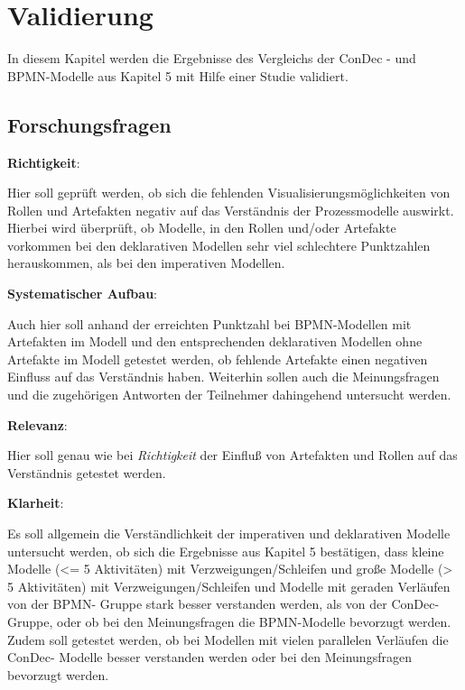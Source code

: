 \chapter{Validierung}\label{sec:chapter7}

In diesem Kapitel werden die Ergebnisse des Vergleichs der ConDec - und BPMN-Modelle aus Kapitel 5 mit Hilfe einer Studie validiert. 


\section{Forschungsfragen}

\textbf{Richtigkeit}: 


Hier soll geprüft werden, ob sich die fehlenden Visualisierungsmöglichkeiten von Rollen und Artefakten negativ auf das Verständnis der Prozessmodelle auswirkt. Hierbei wird überprüft, ob Modelle, in den Rollen und/oder Artefakte vorkommen bei den deklarativen Modellen sehr viel schlechtere Punktzahlen herauskommen, als bei den imperativen Modellen.\newline


\textbf{Systematischer Aufbau}: 


Auch hier soll anhand der erreichten Punktzahl bei BPMN-Modellen mit Artefakten im Modell und den entsprechenden deklarativen Modellen ohne Artefakte im Modell getestet werden, ob fehlende Artefakte einen negativen Einfluss auf das Verständnis haben. Weiterhin sollen auch die Meinungsfragen und die zugehörigen Antworten der Teilnehmer dahingehend untersucht werden.\newline

\textbf{Relevanz}: 

Hier soll genau wie bei \textit{Richtigkeit} der Einfluß von Artefakten und Rollen auf das Verständnis getestet werden.


\textbf{Klarheit}: 

Es soll allgemein die Verständlichkeit der imperativen und deklarativen Modelle untersucht werden, ob sich die Ergebnisse aus Kapitel 5 bestätigen, dass kleine Modelle (<= 5 Aktivitäten) mit Verzweigungen/Schleifen und große Modelle (> 5 Aktivitäten) mit Verzweigungen/Schleifen und Modelle mit geraden Verläufen von der BPMN- Gruppe stark besser verstanden werden, als von der ConDec- Gruppe, oder ob bei den Meinungsfragen die BPMN-Modelle bevorzugt werden. \newline
Zudem soll getestet werden, ob bei Modellen mit vielen parallelen Verläufen die ConDec- Modelle besser verstanden werden oder bei den Meinungsfragen bevorzugt werden.

